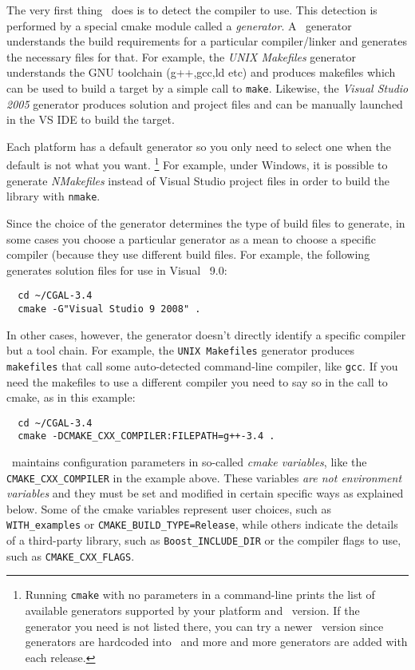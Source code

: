 The very first thing \cmake\ does is to detect the compiler to use.
This detection is performed by a special cmake module called a {\em generator}. A
\cmake\ generator understands the build requirements for a particular compiler/linker
 and generates the necessary files for that. For example, the 
{\em UNIX Makefiles} generator understands the GNU toolchain (g++,gcc,ld etc) and produces makefiles
which can be used to build a target by a simple call to \texttt{make}.
Likewise, the {\em Visual Studio 2005} generator produces solution and project files and can be manually
launched in the VS IDE to build the target.

Each platform has a default generator so you only need to select one when the default is
not what you want. 
\footnote{Running \texttt{cmake} with no parameters in a command-line prints the list of available generators supported 
by your platform and \cmake\ version. If the generator you need is not listed there, you can
try a newer \cmake\ version since generators are hardcoded into \cmake\ and more and
more generators are added with each release.}
For example, under Windows, it is possible to generate {\em NMakefiles}
instead of Visual Studio project files in order to build the library with \texttt{nmake}.

Since the choice of the generator determines the type of build files to generate, in some cases
you choose a particular generator as a mean to choose a specific compiler (because they use different 
build files. For example, the following generates solution files for use in Visual \CC\ 9.0:

{\ccTexHtml{\scriptsize}{}
\begin{verbatim}
  cd ~/CGAL-3.4
  cmake -G"Visual Studio 9 2008" . 
\end{verbatim}
}

In other cases, however, the generator doesn't directly identify a specific compiler but a tool chain.
For example, the \texttt{UNIX Makefiles} generator produces \texttt{makefiles} that call some auto-detected
command-line compiler, like \texttt{gcc}. If you need the makefiles to use a different compiler you need to
say so in the call to cmake, as in this example:

{\ccTexHtml{\scriptsize}{}
\begin{verbatim}
  cd ~/CGAL-3.4
  cmake -DCMAKE_CXX_COMPILER:FILEPATH=g++-3.4 . 
\end{verbatim}
}


\cmake\ maintains configuration parameters in so-called {\em cmake variables}, like the \texttt{CMAKE\_CXX\_COMPILER}
in the example above. These variables {\em are not environment variables} and they must be set and modified in
certain specific ways as explained below. Some of the cmake variables represent user choices, such as
\texttt{WITH\_examples} or \texttt{CMAKE\_BUILD\_TYPE=Release}, while others indicate the details of a third-party library, 
such as \texttt{Boost\_INCLUDE\_DIR} or the compiler flags to use, such as \texttt{CMAKE\_CXX\_FLAGS}. 

